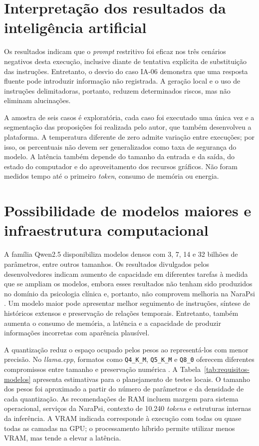 \section{Interpretação dos resultados da inteligência artificial}

Os resultados indicam que o \textit{prompt} restritivo foi eficaz nos três cenários negativos desta execução, inclusive diante de tentativa explícita de substituição das instruções. Entretanto, o desvio do caso IA-06 demonstra que uma resposta fluente pode introduzir informação não registrada. A geração local e o uso de instruções delimitadoras, portanto, reduzem determinados riscos, mas não eliminam alucinações.

A amostra de seis casos é exploratória, cada caso foi executado uma única vez e a segmentação das proposições foi realizada pelo autor, que também desenvolveu a plataforma. A temperatura diferente de zero admite variação entre execuções; por isso, os percentuais não devem ser generalizados como taxa de segurança do modelo. A latência também depende do tamanho da entrada e da saída, do estado do computador e do aproveitamento dos recursos gráficos. Não foram medidos tempo até o primeiro \textit{token}, consumo de memória ou energia.

\section{Possibilidade de modelos maiores e infraestrutura computacional}

A família Qwen2.5 disponibiliza modelos densos com 3, 7, 14 e 32 bilhões de parâmetros, entre outros tamanhos. Os resultados divulgados pelos desenvolvedores indicam aumento de capacidade em diferentes tarefas à medida que se ampliam os modelos, embora esses resultados não tenham sido produzidos no domínio da psicologia clínica e, portanto, não comprovem melhoria na NaraPsi \cite{qwen2024qwen25}. Um modelo maior pode apresentar melhor seguimento de instruções, síntese de históricos extensos e preservação de relações temporais. Entretanto, também aumenta o consumo de memória, a latência e a capacidade de produzir informações incorretas com aparência plausível.

A quantização reduz o espaço ocupado pelos pesos ao representá-los com menor precisão. No \textit{llama.cpp}, formatos como \texttt{Q4\_K\_M}, \texttt{Q5\_K\_M} e \texttt{Q8\_0} oferecem diferentes compromissos entre tamanho e preservação numérica \cite{llamacpp2026quantization}. A Tabela~\ref{tab:requisitos-modelos} apresenta estimativas para o planejamento de testes locais. O tamanho dos pesos foi aproximado a partir do número de parâmetros e da densidade de cada quantização. As recomendações de RAM incluem margem para sistema operacional, serviços da NaraPsi, contexto de 10.240 \textit{tokens} e estruturas internas da inferência. A VRAM indicada corresponde à execução com todas ou quase todas as camadas na GPU; o processamento híbrido permite utilizar menos VRAM, mas tende a elevar a latência.


